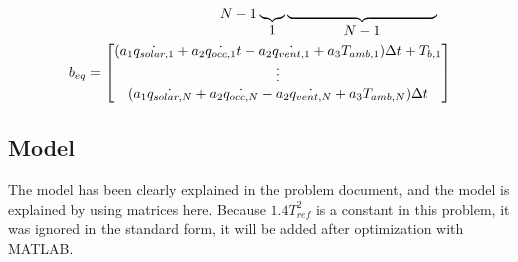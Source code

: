\documentclass[titlepage,a4paper]{article}
\begin{document}
\begin{equation}
\begin{aligned}
\begin{array}{c@{\hspace{10pt}}c@{\hspace{10pt}}c}
{{\begin{array}{cccc}
                    \end{array}}}_{\displaystyle N-1} 
                \underbrace{\hphantom{
                    \begin{array}{c}
                        0 \\ 
                        \vdots \\
                        0 \\
                    \end{array}}}_{\displaystyle 1}
                \underbrace{\hphantom{
                    \begin{array}{ccccc}
                        1 & 0 & \cdots&  & 0\\ 
                        -1 & \ddots&  \ddots & & \vdots \\
                        0 & \ddots &  \ddots & \ddots& \vdots \\
                        \vdots & \ddots & \ddots& \ddots& 0\\
                        0 & \cdots & 0 & -1 & 1 \\
                    \end{array}}}_{\displaystyle N-1} 
            \end{array} \\          
            b_{eq}=
            \begin{bmatrix}
                (a_1 \dot{q_{solar,1}}  + a_2 \dot{q_{occ,1}}  t -a_2 \dot{q_{vent,1}}+ a_3 T_{amb,1}) \Delta t +T_{b,1} \\ 
                \vdots \\ 
                (a_1 \dot{q_{solar,N}} + a_2 \dot{q_{occ,N}}  -a_2 \dot{q_{vent,N}} + a_3 T_{amb,N} )\Delta t                    
            \end{bmatrix} \\                
        \end{aligned}
    \end{equation}



    \subsection{Model}

    The model has been clearly explained in the problem document, and the model is explained by using matrices here. Because $1.4 T_{ref}^2$ is a constant in this problem, it was ignored in the standard form, it will be added after optimization with MATLAB.
\end{document}

